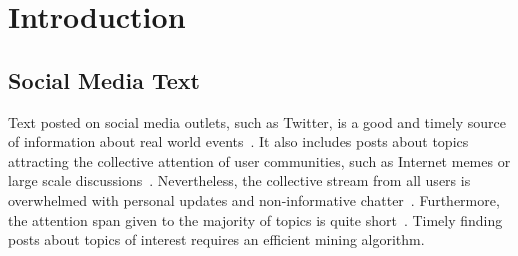 \documentclass[letterpaper,12pt,titlepage,oneside,final]{book}
\begin{document}
 

\chapter{Introduction}


\section{Social Media Text}
Text posted on social media outlets, such as Twitter, is a good and timely source of information
about real world events~\cite{ritter2012open}. 
It also includes posts about topics attracting the collective attention of user communities, 
such as Internet memes or large scale discussions~\cite{naaman2011hip}.
Nevertheless, the collective stream from all users is overwhelmed with personal
updates and non-informative chatter~\cite{java2007we,hurlock2011searching}. 
Furthermore, the attention span given to the majority of topics is quite short~\cite{kwak2010twitter}.
Timely finding posts about topics of interest requires an
efficient mining algorithm.
\end{document}
